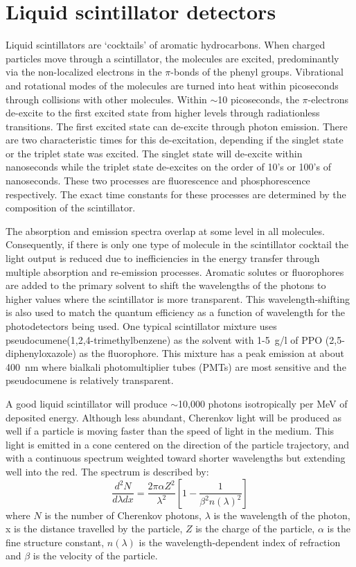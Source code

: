 \documentclass[cits]{JINST}
\begin{document}
\section{Liquid scintillator detectors}
Liquid scintillators are `cocktails' of aromatic hydrocarbons. When
charged particles move through a scintillator, the molecules are
excited, predominantly via the non-localized electrons in the
$\pi$-bonds of the phenyl groups\cite{birks_book}. Vibrational
and rotational modes of the molecules are turned into heat within
picoseconds through collisions with other molecules.  Within $\sim$10
picoseconds, the $\pi$-electrons de-excite to the first excited state
from higher levels through radiationless transitions. The first
excited state can de-excite through photon emission. There are two
characteristic times for this de-excitation, depending if the singlet
state or the triplet state was excited.  The singlet state will
de-excite within nanoseconds while the triplet state de-excites on the
order of 10's or 100's of nanoseconds. These two processes are
fluorescence and phosphorescence respectively. The exact time
constants for these processes are determined by the composition of the
scintillator.

The absorption and emission spectra overlap at some level
in all molecules. Consequently, if there is only one type of molecule in
the scintillator cocktail the light output is reduced due to
inefficiencies in the energy transfer through multiple absorption and
re-emission processes. Aromatic solutes or fluorophores are added to the
primary solvent to shift the wavelengths of the photons to higher values 
where the scintillator is more transparent. This
wavelength-shifting is also used to match the quantum efficiency as a
function of wavelength for the photodetectors being used. One typical
scintillator mixture uses pseudocumene(1,2,4-trimethylbenzene) as the solvent with 1-5~g/l of
PPO (2,5-diphenyloxazole) as the fluorophore. This mixture has a peak emission at about 400~nm
where bialkali photomultiplier tubes (PMTs) are most sensitive and the
pseudocumene is relatively transparent.

A good liquid scintillator will produce $\sim$10,000 photons
isotropically per MeV of deposited energy. Although less abundant,
Cherenkov light will be produced as well if a particle is moving
faster than the speed of light in the medium.  This light is emitted
in a cone centered on the direction of the particle trajectory, and
with a continuous spectrum weighted toward shorter wavelengths but
extending well into the red. The spectrum is described
by\cite{Cherenkov34}:
\begin{equation}
\label{eqCherenkov}
\frac{d^2N}{d\lambda dx} = \frac{2 \pi \alpha Z^2}{\lambda^2} \left [ 1 - \frac{1}{\beta^2 n(\lambda)^2} \right ]
\end{equation}
where $N$ is the number of Cherenkov photons, $\lambda$ is the wavelength of the photon, x is the distance travelled by the particle, $Z$ is the charge of the particle, $\alpha$ is the fine structure constant, $n(\lambda)$ is the wavelength-dependent index of refraction and
$\beta$ is the velocity of the particle. 
\end{document}
